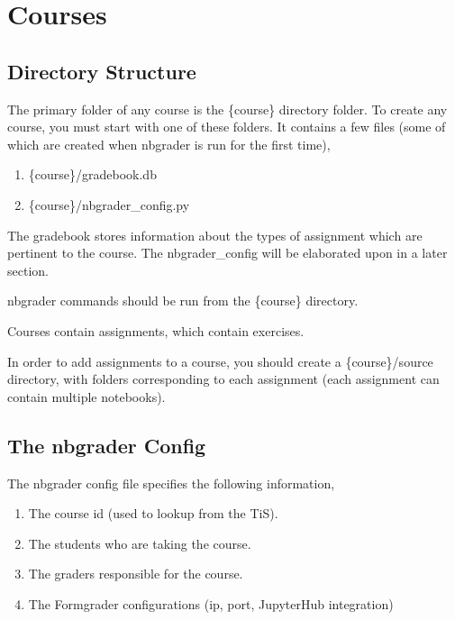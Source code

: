 \section{Courses}
    
    \subsection{Directory Structure}
    
    The primary folder of any course is the \{course\} directory folder. To create any course, you must start with one of these folders. It contains a few files (some of which are created when nbgrader is run for the first time),
    
    \begin{enumerate}
        \item \{course\}/gradebook.db
        \item \{course\}/nbgrader\_config.py
    \end{enumerate}
    
    The gradebook stores information about the types of assignment which are pertinent to the course. The nbgrader\_config will be elaborated upon in a later section.
    
    nbgrader commands should be run from the \{course\} directory.
    
    Courses contain assignments, which contain exercises.
    
    In order to add assignments to a course, you should create a \{course\}/source directory, with folders corresponding to each assignment (each assignment can contain multiple notebooks).
    
    \subsection{The nbgrader Config}
    
    The nbgrader config file specifies the following information,
    
    \begin{enumerate}
        \item The course id (used to lookup from the TiS).
        \item The students who are taking the course.
        \item The graders responsible for the course.
        \item The Formgrader configurations (ip, port, JupyterHub integration)
    \end{enumerate}
    
